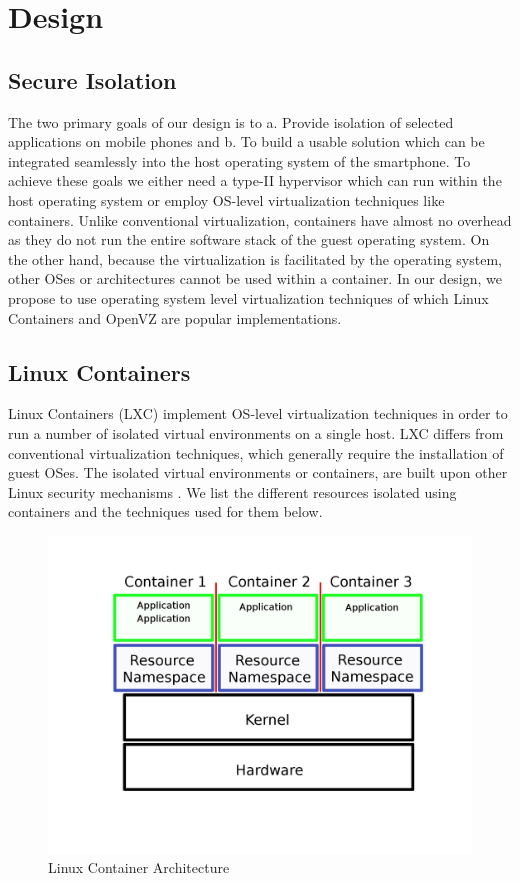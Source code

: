 \section{Design}
\label{sec:design}

\subsection{Secure Isolation}
The two primary goals of our design is to a. Provide isolation of selected applications on mobile phones and b. To build a usable solution which can be integrated seamlessly into the host operating system of the smartphone. To achieve these goals we either need a type-II hypervisor which can run within the host operating system or employ OS-level virtualization techniques like containers.  Unlike conventional virtualization, containers have almost no overhead as they do not run the entire software stack of the guest operating system.  On the other hand, because the virtualization is facilitated by the operating system, other OSes or architectures cannot be used within a container.  In our design, we propose to use operating system level virtualization techniques of which Linux Containers and OpenVZ \cite{OpenVZ} are popular implementations.\\
 
\subsection{Linux Containers}
Linux Containers (LXC) implement OS-level virtualization techniques in order to run a number of isolated virtual environments on a single host.  LXC differs from conventional virtualization techniques, which generally require the installation of guest OSes.  The isolated virtual environments or containers, are built upon other Linux security mechanisms \cite{LSM}. We list the different resources isolated using containers and the techniques used for them below.

\begin{figure}[tbh]
\centering
\includegraphics[width=1.0\columnwidth]{containers}
\caption{Linux Container Architecture}
\label{fig:containers}
\end{figure}


